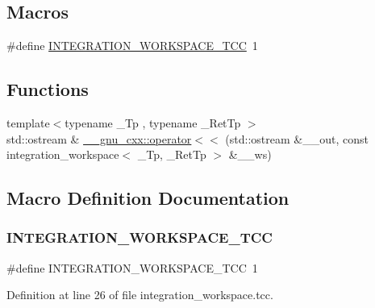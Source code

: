 \subsection*{Macros}
\begin{DoxyCompactItemize}
\item 
\#define \hyperlink{integration__workspace_8tcc_a97fff0b995378b137cf1e5424fb2fa95}{I\+N\+T\+E\+G\+R\+A\+T\+I\+O\+N\+\_\+\+W\+O\+R\+K\+S\+P\+A\+C\+E\+\_\+\+T\+CC}~1
\end{DoxyCompactItemize}
\subsection*{Functions}
\begin{DoxyCompactItemize}
\item 
{\footnotesize template$<$typename \+\_\+\+Tp , typename \+\_\+\+Ret\+Tp $>$ }\\std\+::ostream \& \hyperlink{namespace____gnu__cxx_a2f2af1d76b024a139e350aa0f81ac272}{\+\_\+\+\_\+gnu\+\_\+cxx\+::operator$<$$<$} (std\+::ostream \&\+\_\+\+\_\+out, const integration\+\_\+workspace$<$ \+\_\+\+Tp, \+\_\+\+Ret\+Tp $>$ \&\+\_\+\+\_\+ws)
\end{DoxyCompactItemize}


\subsection{Macro Definition Documentation}
\mbox{\label{integration__workspace_8tcc_a97fff0b995378b137cf1e5424fb2fa95}} 
\subsubsection{\texorpdfstring{I\+N\+T\+E\+G\+R\+A\+T\+I\+O\+N\+\_\+\+W\+O\+R\+K\+S\+P\+A\+C\+E\+\_\+\+T\+CC}{INTEGRATION\_WORKSPACE\_TCC}}
{\footnotesize\ttfamily \#define I\+N\+T\+E\+G\+R\+A\+T\+I\+O\+N\+\_\+\+W\+O\+R\+K\+S\+P\+A\+C\+E\+\_\+\+T\+CC~1}



Definition at line 26 of file integration\+\_\+workspace.\+tcc.

